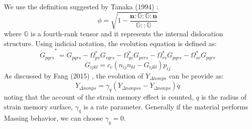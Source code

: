 We use the definition suggested by Tanaka (1994) \cite{tanaka1994nonproportionality}:
\begin{equation}
\phi  = \sqrt {1 - \frac{{{\mathbf{n}}:\mathbb{G}:\mathbb{G}:{\mathbf{n}}}}{{\mathbb{G}::\mathbb{G}}}}
\end{equation}
where $\mathbb{G}$ is a fourth-rank tensor and it represents the internal dislocation structure.
Using indicial notation, the evolution equation is defined as:
\begin{equation}
{\mathring G _{pqrs}}^* = {{\dot G}_{pqrs}} - \Omega _{pv}^*{G_{vqrs}} - \Omega _{qv}^*{G_{pvrs}} - \Omega _{rv}^*{G_{pqvs}} - \Omega _{sv}^*{G_{pqrv}}
\end{equation}
\begin{equation}
{{\dot G}_{ijkl}} = {c_c}\left( {{n_{ij}}{n_{kl}} - {G_{ijkl}}} \right){{\dot p}_{ij}}
\end{equation}
As discussed by Fang (2015) \cite{fang2015cyclic}, the evolution of ${Y_{\Delta nonps}}$ can be provide as:
\begin{equation}
{\dot Y_{\Delta nonps}} = {\gamma _q}\left( {{Y_{\Delta nonpss}} - {Y_{\Delta nonps}}} \right)\dot q
\end{equation}
noting that the account of the strain memory effect is counted, $q$ is the radius of strain memory surface, ${\gamma _q}$ is a rate parameter.
Generally if the material performs Massing behavior, we can choose ${\gamma _q}=0$.
